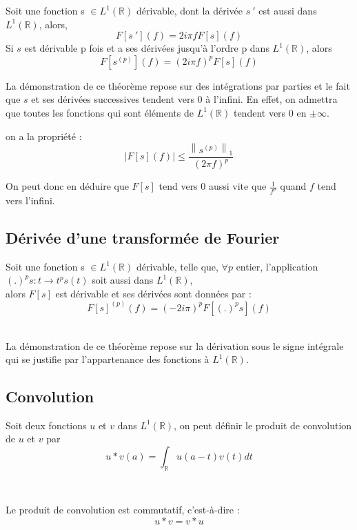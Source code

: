 \begin{thme}\label{thder}
Soit une fonction s $\in L^1(\mathbb{R})$ dérivable, dont la dérivée $s\ '$ est aussi dans $L^1(\mathbb{R})$, alors,
$$F[s\ '](f)=2i\pi f F[s](f)$$
Si $s$ est dérivable p fois et a ses dérivées jusqu'à l'ordre p dans $L^1(\mathbb{R})$, alors
$$F[s^{(p)}](f)={(2i\pi f)}^p F[s](f)$$
\end{thme}
La démonstration de ce théorème repose sur des intégrations par parties et le fait que $s$ et ses dérivées successives tendent vers 0 à l'infini. En effet, on admettra que toutes les fonctions qui sont éléments de $L^1(\mathbb{R})$ tendent vers 0 en $\pm\infty$. 
~~\\
\begin{rmq}
on a la propriété :
$$|F[s](f)|\leq \frac{\left\|s^{(p)}\right\|_{1}}{{(2\pi f)}^p}$$
\end{rmq}

On peut donc en déduire que $F[s]$ tend vers 0 aussi vite que $\frac{1}{f^p}$ quand $f$ tend vers l'infini. 

\subsection{Dérivée d'une transformée de Fourier}

\begin{thme}
Soit une fonction s $\in L^1(\mathbb{R})$ dérivable, telle que, $\forall p$ entier, l'application $(.)^ps : t\rightarrow t^ps(t)$ soit aussi dans $L^1(\mathbb{R})$, 
~~\\
alors $F[s]$ est dérivable et ses dérivées sont données par :
$$F[s]^{(p)}(f)={(-2i\pi)}^p F[(.)^p s](f)$$
\end{thme}
~~\\
La démonstration de ce théorème repose sur la dérivation sous le signe intégrale qui se justifie par l'appartenance des fonctions à $L^1(\mathbb{R})$. 


\subsection{Convolution}
\begin{definition}
Soit deux fonctions $u$ et $v$ dans $L^1(\mathbb{R})$, on peut définir le produit de convolution de $u$ et $v$ par $$u*v(a)=\int_\mathbb{R}u(a-t)v(t)dt$$
\end{definition}
~~\

\begin{prot} 
Le produit de convolution est commutatif, c'est-à-dire :
$$u*v=v*u$$
\end{prot}
~~\

